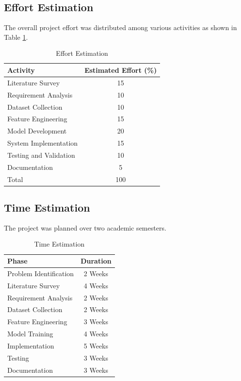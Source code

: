 \documentclass[12pt]{report}
\begin{document}
\subsection{Effort Estimation}

The overall project effort was distributed among various activities as shown in Table \ref{tab:effort}.

\begin{table}[H]
\centering
\caption{Effort Estimation}
\label{tab:effort}
\begin{tabular}{|l|c|}
\hline
\textbf{Activity} & \textbf{Estimated Effort (\%)} \\
\hline
Literature Survey & 15 \\
Requirement Analysis & 10 \\
Dataset Collection & 10 \\
Feature Engineering & 15 \\
Model Development & 20 \\
System Implementation & 15 \\
Testing and Validation & 10 \\
Documentation & 5 \\
\hline
Total & 100 \\
\hline
\end{tabular}
\end{table}

\subsection{Time Estimation}

The project was planned over two academic semesters.

\begin{table}[H]
\centering
\caption{Time Estimation}
\begin{tabular}{|l|c|}
\hline
\textbf{Phase} & \textbf{Duration} \\
\hline
Problem Identification & 2 Weeks \\
Literature Survey & 4 Weeks \\
Requirement Analysis & 2 Weeks \\
Dataset Collection & 2 Weeks \\
Feature Engineering & 3 Weeks \\
Model Training & 4 Weeks \\
Implementation & 5 Weeks \\
Testing & 3 Weeks \\
Documentation & 3 Weeks \\
\hline
\end{tabular}
\end{table}
\end{document}
